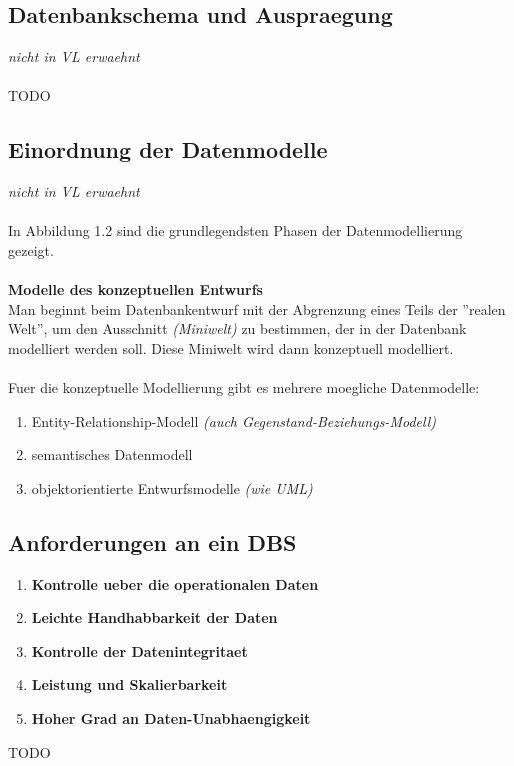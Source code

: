\documentclass[a4paper,10pt]{article}
\begin{document}
\subsection{Datenbankschema und Auspraegung}
\emph{nicht in VL erwaehnt}
\\~\\
TODO

\subsection{Einordnung der Datenmodelle}
\emph{nicht in VL erwaehnt}
\\~\\
In Abbildung 1.2 sind die grundlegendsten Phasen der Datenmodellierung gezeigt.
\\~\\
\textbf{Modelle des konzeptuellen Entwurfs}\\
Man beginnt beim Datenbankentwurf mit der Abgrenzung eines Teils der ''realen Welt'', um den Ausschnitt \emph{(Miniwelt)} zu bestimmen, der in der Datenbank modelliert werden soll. Diese Miniwelt wird dann konzeptuell modelliert.
\\~\\
Fuer die konzeptuelle Modellierung gibt es mehrere moegliche Datenmodelle:
\begin{enumerate}
\item Entity-Relationship-Modell \emph{(auch Gegenstand-Beziehungs-Modell)}
\item semantisches Datenmodell
\item objektorientierte Entwurfsmodelle \emph{(wie UML)}
\end{enumerate}

\subsection{Anforderungen an ein DBS}
\begin{enumerate}
\item \textbf{Kontrolle ueber die operationalen Daten}
\item \textbf{Leichte Handhabbarkeit der Daten}
\item \textbf{Kontrolle der Datenintegritaet}
\item \textbf{Leistung und Skalierbarkeit}
\item \textbf{Hoher Grad an Daten-Unabhaengigkeit}
\end{enumerate}

TODO
\end{document}
